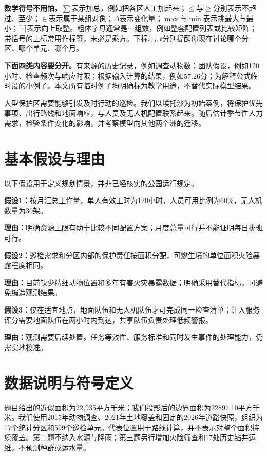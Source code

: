 \documentclass[12pt,a4paper]{article}
\numberwithin{equation}{section}
\begin{document}
\noindent\textbf{数学符号不用怕。}$\sum$表示加总，例如把各区人工加起来；$\le$与$\ge$分别表示不超过、至少；$\in$表示属于某组对象；$\Delta$表示变化量；$\max$与$\min$表示挑最大与最小；$\lceil\cdot\rceil$表示向上取整。粗体字母通常是一组数，例如整套配置列表或比较矩阵；带括号的上标常用作标签，未必是乘方。下标$i,j,t$分别提醒你现在讨论哪个分区、哪个单元、哪个月。

\noindent\textbf{下面四类内容要分开。}有来源的历史记录，例如调查动物数；团队假设，例如120小时、检查频次与响应时限；根据输入计算的结果，例如57.26分；为解释公式临时设的小例子。本文所有临时例子均明确标为教学用途，不替代实际模型结果。

大型保护区需要能够引发及时行动的巡检。我们以埃托沙为初始案例，将保护优先事项、出行路线和地面响应，与人员及无人机配置联系起来。随后估计季节性人力需求，检验条件变化的影响，并考察模型向其他两个洲的迁移。

\section{基本假设与理由}
以下假设用于定义规划情景，并非已经核实的公园运行规定。

\textbf{假设1：}按月汇总工作量，单人有效工时为120小时，人员可用比例为60\%，无人机数量为30架。

\textbf{理由：}明确资源上限有助于比较不同配置方案；月度总量可行并不能证明每日排班可行。

\textbf{假设2：}巡检需求和分区内部的保护责任按面积分配，可燃生境的单位面积火险暴露程度相同。

\textbf{理由：}目前缺少精细动物位置和多年有害火灾暴露数据；明确采用替代指标，可避免编造观测结果。

\textbf{假设3：}仅在适宜地点，地面队伍和无人机队伍才可完成同一检查清单；计入服务评分需要地面队伍在两小时内到达，共享队伍负责处理低频警报。

\textbf{理由：}观测需要后续处置。任务等效性、服务标准和同时发生事件的处理能力，仍需实地校准。

\section{数据说明与符号定义}
题目给出的近似面积为22,935平方千米；我们投影后的边界面积为22897.10平方千米。我们使用2015年动物调查、2021年土地覆盖和固定的2026年道路快照\cite{problem,survey,worldcover,osm}，组织为17个统计分区和599个巡检单元。代表位置用于路线计算，并不表示对整个面积持续覆盖。第二题不纳入水源与降雨；第三题另行增加火险筛查和17处历史钻井运维，不预测种群或运水量。
\end{document}
